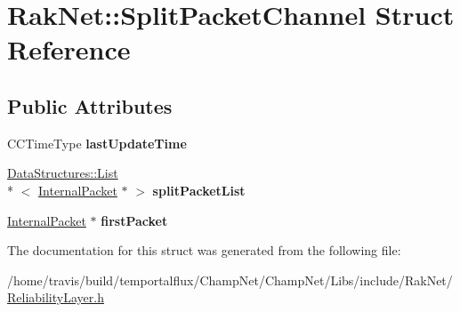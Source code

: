 \hypertarget{struct_rak_net_1_1_split_packet_channel}{\section{Rak\-Net\-:\-:Split\-Packet\-Channel Struct Reference}
\label{struct_rak_net_1_1_split_packet_channel}
}
\subsection*{Public Attributes}
\begin{DoxyCompactItemize}
\item 
\hypertarget{struct_rak_net_1_1_split_packet_channel_a14b7d9b679ed211987b8a30ea9adf279}{C\-C\-Time\-Type {\bfseries last\-Update\-Time}}\label{struct_rak_net_1_1_split_packet_channel_a14b7d9b679ed211987b8a30ea9adf279}

\item 
\hypertarget{struct_rak_net_1_1_split_packet_channel_a79b652045db3a4340f40ce76fc26be1f}{\hyperlink{class_data_structures_1_1_list}{Data\-Structures\-::\-List}\\*
$<$ \hyperlink{struct_rak_net_1_1_internal_packet}{Internal\-Packet} $\ast$ $>$ {\bfseries split\-Packet\-List}}\label{struct_rak_net_1_1_split_packet_channel_a79b652045db3a4340f40ce76fc26be1f}

\item 
\hypertarget{struct_rak_net_1_1_split_packet_channel_a6de9655c1e16675cc3e2e2e49b2b6bc9}{\hyperlink{struct_rak_net_1_1_internal_packet}{Internal\-Packet} $\ast$ {\bfseries first\-Packet}}\label{struct_rak_net_1_1_split_packet_channel_a6de9655c1e16675cc3e2e2e49b2b6bc9}

\end{DoxyCompactItemize}


The documentation for this struct was generated from the following file\-:\begin{DoxyCompactItemize}
\item 
/home/travis/build/temportalflux/\-Champ\-Net/\-Champ\-Net/\-Libs/include/\-Rak\-Net/\hyperlink{_reliability_layer_8h}{Reliability\-Layer.\-h}\end{DoxyCompactItemize}
